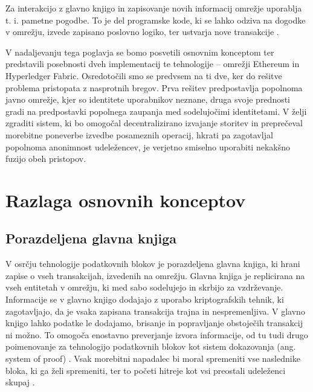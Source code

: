 \documentclass[a4paper, 12pt]{book}
\begin{document}
Za interakcijo z glavno knjigo in zapisovanje novih informacij omrežje uporablja t. i. pametne pogodbe.
To je del programske kode, ki se lahko odziva na dogodke v omrežju, izvede zapisano poslovno logiko, ter ustvarja nove transakcije \cite{hyperledgerDocs}.

V nadaljevanju tega poglavja se bomo posvetili osnovnim konceptom ter predstavili posebnosti dveh implementacij te tehnologije -- omrežji Ethereum in Hyperledger Fabric.
Osredotočili smo se predvsem na ti dve, ker do rešitve problema pristopata z nasprotnih bregov.
Prva rešitev predpostavlja popolnoma javno omrežje, kjer so identitete uporabnikov neznane, druga svoje prednosti gradi na predpostavki popolnega zaupanja med sodelujočimi identitetami.
V želji zgraditi sistem, ki bo omogočal decentralizirano izvajanje storitev in preprečeval morebitne poneverbe izvedbe posameznih operacij, hkrati pa zagotavljal popolnoma anonimnost udeležencev, je verjetno smiselno uporabiti nekakšno fuzijo obeh pristopov.

\section{Razlaga osnovnih konceptov}

\subsection{Porazdeljena glavna knjiga}
V osrčju tehnologije podatkovnih blokov je porazdeljena glavna knjiga, ki hrani zapise o vseh transakcijah, izvedenih na omrežju.
Glavna knjiga je replicirana na vseh entitetah v omrežju, ki med sabo sodelujejo in skrbijo za vzdrževanje.
Informacije se v glavno knjigo dodajajo z uporabo kriptografskih tehnik, ki zagotavljajo, da je vsaka zapisana transakcija trajna in nespremenljiva.
V glavno knjigo lahko podatke le dodajamo, brisanje in popravljanje obstoječih transakcij ni možno.
To omogoča enostavno preverjanje izvora informacije, od tu tudi drugo poimenovanje za tehnologijo podatkovnih blokov kot sistem dokazovanja (ang. system of proof) \cite{hyperledgerDocs}.
Vsak morebitni napadalec bi moral spremeniti vse naslednike bloka, ki ga želi spremeniti, ter to početi hitreje kot vsi preostali udeleženci skupaj \cite{hampton2016understanding}.
\end{document}
